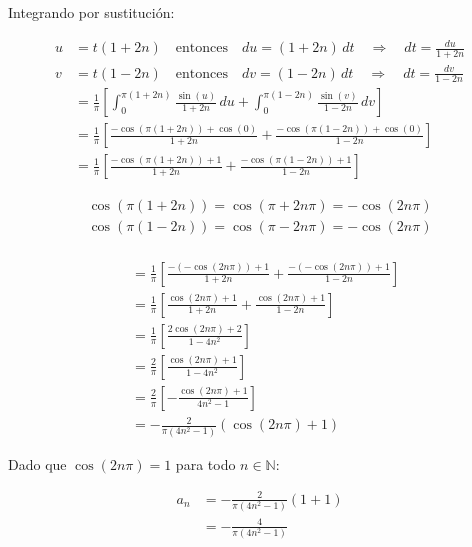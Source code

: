 \documentclass[12pt,a4paper]{report}
\begin{document}
\begin{enumerate}[label=\alph*),left=0pt]
\begin{itemize}[left=0pt]
  Integrando por sustitución:
  
  $$
  \begin{aligned}
    u &= t(1 + 2n) \quad \text{entonces} \quad du = (1 + 2n) \, dt \quad \Longrightarrow \quad dt = \frac{du}{1 + 2n} \\
    v &= t(1 - 2n) \quad \text{entonces} \quad dv = (1 - 2n) \, dt \quad \Longrightarrow \quad dt = \frac{dv}{1 - 2n} \\
    &= \frac{1}{\pi} \left[ \int_0^{\pi(1+2n)} \frac{\sin(u)}{1+2n} \, du + \int_0^{\pi(1-2n)} \frac{\sin(v)}{1-2n} \, dv \right] \\
    &= \frac{1}{\pi} \left[ \frac{-\cos(\pi(1+2n)) + \cos(0)}{1+2n} + \frac{-\cos(\pi(1-2n)) + \cos(0)}{1-2n} \right] \\
    &= \frac{1}{\pi} \left[ \frac{-\cos(\pi(1+2n)) + 1}{1+2n} + \frac{-\cos(\pi(1-2n)) + 1}{1-2n} \right]
  \end{aligned}
  $$
  
  
  

  $$
  \begin{aligned}
  \cos(\pi(1+2n)) = \cos(\pi + 2n\pi) = -\cos(2n\pi) \\
  \cos(\pi(1-2n)) = \cos(\pi - 2n\pi) = -\cos(2n\pi) \\
  \end{aligned}
  $$

  $$
  \begin{aligned}
    &= \frac{1}{\pi} \left[ \frac{-(-\cos(2n\pi)) + 1}{1+2n} + \frac{-(-\cos(2n\pi)) + 1}{1-2n} \right] \\
    &= \frac{1}{\pi} \left[ \frac{\cos(2n\pi) + 1}{1+2n} + \frac{\cos(2n\pi) + 1}{1-2n} \right] \\
    &= \frac{1}{\pi} \left[ \frac{2\cos(2n\pi) + 2}{1 - 4n^2} \right] \\
    &= \frac{2}{\pi} \left[ \frac{\cos(2n\pi) + 1}{1 - 4n^2} \right] \\
    &= \frac{2}{\pi} \left[ -\frac{\cos(2n\pi) + 1}{4n^2 - 1} \right] \\
    &= -\frac{2}{\pi (4n^2 - 1)} (\cos(2n\pi) + 1)
  \end{aligned}
  $$
  
  Dado que \(\cos(2n\pi) = 1\) para todo \(n \in \mathbb{N}\):
  
  $$
  \begin{aligned}
    a_n &= -\frac{2}{\pi (4n^2 - 1)} (1 + 1) \\
        &= -\frac{4}{\pi (4n^2 - 1)}
  \end{aligned}
  $$
  

\end{itemize}
\end{enumerate}
\end{document}
